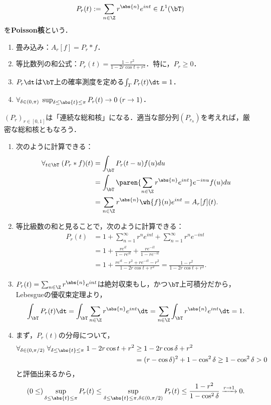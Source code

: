 \documentclass[uplatex,dvipdfmx]{jsreport}
\begin{document}
\begin{proposition}[Poisson核は連続に添え字づけられた総和核である]
    \[P_r(t):=\sum_{n\in\Z}r^{\abs{n}}e^{int}\in L^1(\bT)\]
    を\textbf{Poisson核}という．
    \begin{enumerate}
        \item 畳み込み：$A_r[f]=P_r*f$．
        \item 等比数列の和公式：$P_r(t)=\frac{1-r^2}{1-2r\cos t+r^2}$．特に，$P_r\ge0$．
        \item $P_r\dt$は$\bT$上の確率測度を定める$\int_TP_r(t)\dt=1$．
        \item $\forall_{\delta\in(0,\pi)}\;\sup_{\delta\le\abs{t}\le\pi}P_r(t)\to0\;(r\to1)$．
    \end{enumerate}
    $(P_r)_{r\in[0,1]}$は「連続な総和核」になる．適当な部分列$(P_{r_n})$を考えれば，厳密な総和核ともなろう．
\end{proposition}
\begin{Proof}\mbox{}
    \begin{enumerate}
        \item 次のように計算できる：
        \begin{align*}
            \forall_{t\in\bT}\;(P_r*f)(t)&=\int_\bT P_r(t-u)f(u)du\\
            &=\int_\bT\paren{\sum_{n\in\Z}r^{\abs{n}}e^{int}}e^{-inu}f(u)du\\
            &=\sum_{n\in\Z}r^{\abs{n}}\wh{f}(n)e^{int}=A_r[f](t).
        \end{align*}
        \item 等比級数の和と見ることで，次のように計算できる：
        \begin{align*}
            P_r(t)&=1+\sum_{n=1}^\infty r^ne^{int}+\sum_{n=1}^\infty r^ne^{-int}\\
            &=1+\frac{re^{it}}{1-re^{it}}+\frac{re^{-it}}{1-re^{-it}}\\
            &=1+\frac{re^{it}-r^2+re^{-it}-r^2}{1-2r\cos t+r^2}=\frac{1-r^2}{1-2r\cos t+r^2}.
        \end{align*}
        \item $P_r(t)=\sum_{n\in\Z}r^{\abs{n}}e^{int}$は絶対収束もし，かつ$\bT$上可積分だから，Lebesgueの優収束定理より，
        \[\int_\bT P_r(t)\dt=\int_\bT\sum_{n\in\Z}r^{\abs{n}}e^{int}\dt=\sum_{n\in\Z}\int_\bT r^{\abs{n}}e^{int}\dt=1.\]
        \item まず，$P_r(t)$の分母について，
        \begin{align*}
            \forall_{\delta\in(0,\pi/2)}\;\forall_{\delta\le\abs{t}\le\pi}\;1-2r\cos t+r^2&\ge1-2r\cos\delta+r^2\\
            &=(r-\cos\delta)^2+1-\cos^2\delta\ge 1-\cos^2\delta>0
        \end{align*}
        と評価出来るから，
        \[(0\le)\sup_{\delta\le\abs{t}\le\pi}P_r(t)\le\sup_{\delta\le\abs{t}\le\pi,\delta\in(0,\pi/2)}P_r(t)\le\frac{1-r^2}{1-\cos^2\delta}\xrightarrow{r\to1}0.\]
    \end{enumerate}
\end{Proof}
\end{document}
